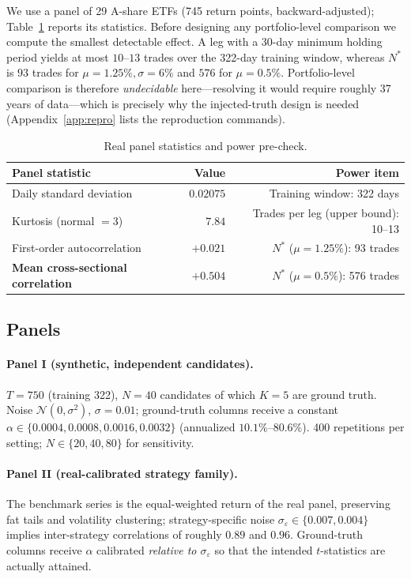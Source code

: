 \documentclass[11pt]{article}
\begin{document}
We use a panel of 29 A-share ETFs (745 return points, backward-adjusted); Table~\ref{tab:data}
reports its statistics. Before designing any portfolio-level comparison we compute the smallest
detectable effect. A leg with a 30-day minimum holding period yields at most $10$--$13$ trades
over the 322-day training window, whereas $N^{*}$ is $93$ trades for $\mu=1.25\%,\sigma=6\%$ and
$576$ for $\mu=0.5\%$. Portfolio-level comparison is therefore \emph{undecidable}
here---resolving it would require roughly 37 years of data---which is precisely why the
injected-truth design is needed (Appendix~\ref{app:repro} lists the reproduction commands).

\begin{table}[htbp]
\centering
\caption{Real panel statistics and power pre-check.}
\label{tab:data}
\small
\begin{tabular}{@{}lrr@{}}
\toprule
\textbf{Panel statistic} & \textbf{Value} & \textbf{Power item} \\
\midrule
Daily standard deviation & $0.02075$ & Training window: 322 days \\
Kurtosis (normal $=3$) & $7.84$ & Trades per leg (upper bound): 10--13 \\
First-order autocorrelation & $+0.021$ & $N^{*}$ ($\mu=1.25\%$): 93 trades \\
\textbf{Mean cross-sectional correlation} & $\mathbf{+0.504}$ & $N^{*}$ ($\mu=0.5\%$): 576 trades \\
\bottomrule
\end{tabular}
\end{table}

\subsection{Panels}

\paragraph{Panel I (synthetic, independent candidates).} $T=750$ (training 322), $N=40$
candidates of which $K=5$ are ground truth. Noise $\mathcal{N}(0,\sigma^2)$, $\sigma=0.01$;
ground-truth columns receive a constant $\alpha\in\{0.0004,0.0008,0.0016,0.0032\}$ (annualized
$10.1\%$--$80.6\%$). 400 repetitions per setting; $N\in\{20,40,80\}$ for sensitivity.

\paragraph{Panel II (real-calibrated strategy family).} The benchmark series is the equal-weighted
return of the real panel, preserving fat tails and volatility clustering; strategy-specific noise
$\sigma_\varepsilon\in\{0.007,0.004\}$ implies inter-strategy correlations of roughly $0.89$ and
$0.96$. Ground-truth columns receive $\alpha$ calibrated \emph{relative to $\sigma_\varepsilon$}
so that the intended $t$-statistics are actually attained.
\end{document}
